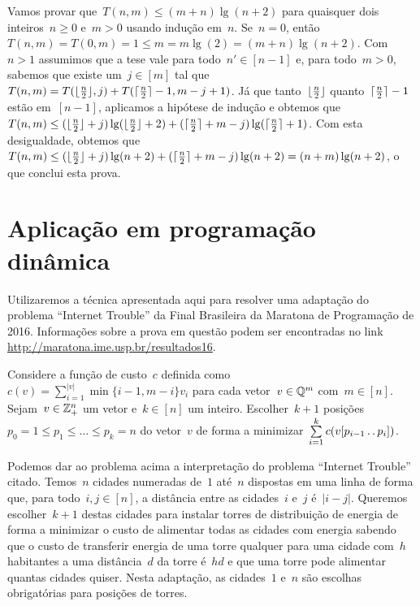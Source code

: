 Vamos provar que~$T(n,m) \leq (m+n)\lg(n + 2)$ para quaisquer dois inteiros~${ n \geq 0 }$ e~$m > 0$ usando indução em~$n$. Se~${ n = 0 }$, então~${ T(n,m) = T(0,m) = 1 \leq m = m\lg(2) =  (m + n)\lg(n+2) }$. Com~${ n > 1 }$ assumimos que a tese vale para todo~${ n' \in [n-1] }$ e, para todo~$m > 0$, sabemos que existe um~${ j \in [m] }$ tal que~${ T(n,m) = T(\lfloor \frac{n}{2} \rfloor,j) + T(\lceil \frac{n}{2} \rceil - 1, m - j + 1) }$. Já que tanto~$\lfloor \frac{n}{2} \rfloor$ quanto~$\lceil \frac{n}{2} \rceil - 1$ estão em~$[n-1]$, aplicamos a hipótese de indução e obtemos que~${ T(n,m) \leq (\lfloor \frac{n}{2} \rfloor + j)\lg(\lfloor \frac{n}{2} \rfloor + 2) + (\lceil \frac{n}{2} \rceil + m - j)\lg(\lceil \frac{n}{2} \rceil + 1) }$. Com esta desigualdade, obtemos que~${ T(n,m) \leq (\lfloor \frac{n}{2} \rfloor + j)\lg(n + 2) + (\lceil \frac{n}{2} \rceil + m - j)\lg(n + 2) = (n + m)\lg(n+2) }$, o que conclui esta prova.


\section{Aplicação em programação dinâmica} \label{DivConq:DP}

Utilizaremos a técnica apresentada aqui para resolver uma adaptação do problema ``Internet Trouble'' da Final Brasileira da Maratona de Programação de 2016. Informações sobre a prova em questão podem ser encontradas no link \url{http://maratona.ime.usp.br/resultados16}.  

\begin{prob} \label{DivConq:InternetTrouble}
Considere a função de custo~$c$ definida como~${ c(v) = \sum\limits_{i=1}^{|v|} \min\{i-1,m-i\} v_i }$ para cada vetor~${ v \in \mathbb{Q}^m }$ com~${ m \in [n] }$. Sejam~${ v \in \mathbb{Z}_+^n }$ um vetor e~$k \in [n]$ um inteiro. Escolher~$k+1$ posições~${ p_0 = 1 \leq p_1 \leq \dots \leq p_k = n }$ do vetor~$v$ de forma a minimizar~${ \sum\limits_{ i = 1 }^k c(v[p_{i-1} \,.\,.\, p_i]) }$.
\end{prob}

Podemos dar ao problema acima a interpretação do problema ``Internet Trouble'' citado. Temos~$n$ cidades numeradas de~$1$ até~$n$ dispostas em uma linha de forma que, para todo~$i,j \in [n]$, a distância entre as cidades~$i$ e~$j$ é~$|i-j|$. Queremos escolher~${ k + 1 }$ destas cidades para instalar torres de distribuição de energia de forma a minimizar o custo de alimentar todas as cidades com energia sabendo que o custo de transferir energia de uma torre qualquer para uma cidade com~$h$ habitantes a uma distância~$d$ da torre é~$hd$ e que uma torre pode alimentar quantas cidades quiser. Nesta adaptação, as cidades~$1$ e~$n$ são escolhas obrigatórias para posições de torres. 

